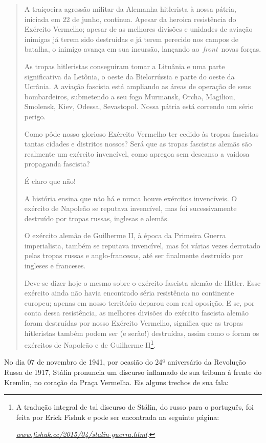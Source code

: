 \begin{quote}
A traiçoeira agressão militar da Alemanha hitlerista à nossa pátria,
iniciada em 22 de junho, continua. Apesar da heroica resistência do
Exército Vermelho; apesar de as melhores divisões e unidades de aviação
inimigas já terem sido destruídas e já terem perecido nos campos de
batalha, o inimigo avança em sua incursão, lançando
ao~\emph{front}~novas forças.

As tropas hitleristas conseguiram tomar a Lituânia e uma parte
significativa da Letônia, o oeste da Bielorrússia e parte do oeste da
Ucrânia. A aviação fascista está ampliando as áreas de operação de seus
bombardeiros, submetendo a seu fogo Murmansk, Orcha, Magiliou, Smolensk,
Kiev, Odessa, Sevastopol. Nossa pátria está correndo um sério perigo.

Como pôde nosso glorioso Exército Vermelho ter cedido às tropas
fascistas tantas cidades e distritos nossos? Será que as tropas
fascistas alemãs são realmente um exército invencível, como apregoa sem
descanso a vaidosa propaganda fascista?

É claro que não!

A história ensina que não há e nunca houve exércitos invencíveis. O
exército de Napoleão se reputava invencível, mas foi sucessivamente
destruído por tropas russas, inglesas e alemãs.

O exército alemão de Guilherme II, à época da Primeira Guerra
imperialista, também se reputava invencível, mas foi várias vezes
derrotado pelas tropas russas e anglo-francesas, até ser finalmente
destruído por ingleses e franceses.

Deve-se dizer hoje o mesmo sobre o exército fascista alemão de Hitler.
Esse exército ainda não havia encontrado séria resistência no continente
europeu; apenas em nosso território deparou com real oposição. E se, por
conta dessa resistência, as melhores divisões do exército fascista
alemão foram destruídas por nosso Exército Vermelho, significa que as
tropas hitleristas também podem ser (e serão!) destruídas, assim como o
foram os exércitos de Napoleão e de Guilherme II\footnote{A tradução
  integral de tal discurso de Stálin, do russo para o português, foi
  feita por Erick Fishuk e pode ser encontrada na seguinte página:

  \href{http://www.fishuk.cc/2015/04/stalin-guerra.html}{\emph{www.fishuk.cc/2015/04/stalin-guerra.html}}.}.
\end{quote}

No dia 07 de novembro de 1941, por ocasião do 24º aniversário da
Revolução Russa de 1917, Stálin pronuncia um discurso inflamado de sua
tribuna à frente do Kremlin, no coração da Praça Vermelha. Eis alguns
trechos de sua fala:

